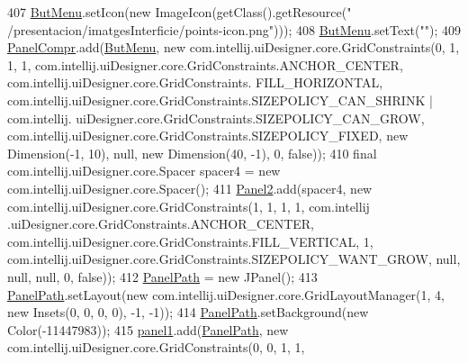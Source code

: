 \begin{DoxyCode}
407         \hyperlink{classpresentacion_1_1form_1_1mainForm_aef69e0291d6680e935cf1161971b3b29}{ButMenu}.setIcon(\textcolor{keyword}{new} ImageIcon(getClass().getResource(\textcolor{stringliteral}{"
      /presentacion/imatgesInterficie/points-icon.png"})));
408         \hyperlink{classpresentacion_1_1form_1_1mainForm_aef69e0291d6680e935cf1161971b3b29}{ButMenu}.setText(\textcolor{stringliteral}{""});
409         \hyperlink{classpresentacion_1_1form_1_1mainForm_a2d0f3d20d2a80c16321aaccbc273279d}{PanelCompr}.add(\hyperlink{classpresentacion_1_1form_1_1mainForm_aef69e0291d6680e935cf1161971b3b29}{ButMenu}, \textcolor{keyword}{new} com.intellij.uiDesigner.core.GridConstraints(0, 1, 1, 
      1, com.intellij.uiDesigner.core.GridConstraints.ANCHOR\_CENTER, com.intellij.uiDesigner.core.GridConstraints.
      FILL\_HORIZONTAL, com.intellij.uiDesigner.core.GridConstraints.SIZEPOLICY\_CAN\_SHRINK | com.intellij.
      uiDesigner.core.GridConstraints.SIZEPOLICY\_CAN\_GROW, com.intellij.uiDesigner.core.GridConstraints.SIZEPOLICY\_FIXED, \textcolor{keyword}{
      new} Dimension(-1, 10), null, \textcolor{keyword}{new} Dimension(40, -1), 0, \textcolor{keyword}{false}));
410         \textcolor{keyword}{final} com.intellij.uiDesigner.core.Spacer spacer4 = \textcolor{keyword}{new} com.intellij.uiDesigner.core.Spacer();
411         \hyperlink{classpresentacion_1_1form_1_1mainForm_a40e87b5e341114287b070012a4aadc8f}{Panel2}.add(spacer4, \textcolor{keyword}{new} com.intellij.uiDesigner.core.GridConstraints(1, 1, 1, 1, com.intellij
      .uiDesigner.core.GridConstraints.ANCHOR\_CENTER, com.intellij.uiDesigner.core.GridConstraints.FILL\_VERTICAL, 
      1, com.intellij.uiDesigner.core.GridConstraints.SIZEPOLICY\_WANT\_GROW, null, null, null, 0, \textcolor{keyword}{false}));
412         \hyperlink{classpresentacion_1_1form_1_1mainForm_a0704eebe3c2e55cfd3b9344cca4d2d4b}{PanelPath} = \textcolor{keyword}{new} JPanel();
413         \hyperlink{classpresentacion_1_1form_1_1mainForm_a0704eebe3c2e55cfd3b9344cca4d2d4b}{PanelPath}.setLayout(\textcolor{keyword}{new} com.intellij.uiDesigner.core.GridLayoutManager(1, 4, \textcolor{keyword}{new} Insets(0,
       0, 0, 0), -1, -1));
414         \hyperlink{classpresentacion_1_1form_1_1mainForm_a0704eebe3c2e55cfd3b9344cca4d2d4b}{PanelPath}.setBackground(\textcolor{keyword}{new} Color(-11447983));
415         \hyperlink{classpresentacion_1_1form_1_1mainForm_aa43e009cc6dc09d4e637385fbd361510}{panel1}.add(\hyperlink{classpresentacion_1_1form_1_1mainForm_a0704eebe3c2e55cfd3b9344cca4d2d4b}{PanelPath}, \textcolor{keyword}{new} com.intellij.uiDesigner.core.GridConstraints(0, 0, 1, 1, 

\end{DoxyCode}

